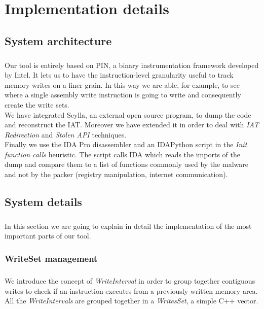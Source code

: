 \chapter{Implementation details}
\label{chapter4}
\thispagestyle{empty}

\section{System architecture}
\paragraph{}
Our tool is entirely based on PIN, a binary instrumentation framework developed by Intel. It lets us to have the instruction-level granularity useful to track memory writes on a finer grain. In this way we are able, for example, to see where a single assembly write instruction is going to write and consequently create the write sets.\\
We have integrated Scylla, an external open source program, to dump the code and reconstruct the IAT. Moreover we have extended it in order to deal with \textit{IAT Redirection} and \textit{Stolen API} techniques.\\
Finally we use the IDA Pro disassembler and an IDAPython script in the \textit{Init function calls} heuristic. The script calls IDA which reads the imports of the dump and compare them to a list of functions commonly used by the malware and not by the packer (registry manipulation, internet communication).

\section{System details}
\paragraph{}
In this section we are going to explain in detail the implementation of the most important parts of our tool.

\subsection{WriteSet management}
\paragraph{}
We introduce the concept of \textit{WriteInterval} in order to group together contiguous writes to check if an instruction executes from a previously written memory area. All the \textit{WriteIntervals} are grouped together in a \textit{WritesSet}, a simple C++ vector.\\
